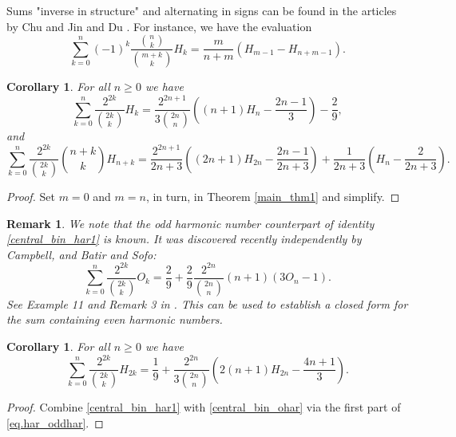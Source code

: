 \documentclass[11pt,reqno]{amsart}
\theoremstyle{plain}
\numberwithin{equation}{section}
\newtheorem{corollary}[thm]{Corollary}
\newtheorem{remark}[thm]{Remark}
\begin{document}
Sums "inverse in structure" and alternating in signs can be found in the articles by Chu \cite{Chu} and Jin and Du \cite{Jin}.
For instance, we have the evaluation
\begin{equation*}
\sum_{k=0}^n (-1)^k \frac{\binom{n}{k}}{\binom{m+k}{k}} H_k = \frac{m}{n+m} \left ( H_{m-1} - H_{n+m-1} \right ).
\end{equation*}

\begin{corollary}
For all $n\geq 0$ we have
\begin{equation}\label{central_bin_har1}
\sum_{k=0}^n \frac{2^{2k}}{\binom{2k}{k}} H_k = \frac{2^{2n+1}}{3\binom{2n}{n}}\left ( (n+1)H_n - \frac{2n-1}{3} \right ) - \frac{2}{9},
\end{equation}
and
\begin{equation}\label{central_bin_har2}
\sum_{k=0}^n \frac{2^{2k}}{\binom{2k}{k}} \binom{n+k}{k} H_{n+k} = \frac{2^{2n+1}}{2n+3}\left ( (2n+1)H_{2n} - \frac{2n-1}{2n+3} \right )
+ \frac{1}{2n+3}\left ( H_{n} - \frac{2}{2n+3} \right ).
\end{equation}
\end{corollary}
\begin{proof}
Set $m=0$ and $m=n$, in turn, in Theorem \ref{main_thm1} and simplify.
\end{proof}

\begin{remark}
We note that the odd harmonic number counterpart of identity \eqref{central_bin_har1} is known. It was discovered recently independently by 
Campbell, and Batir and Sofo:
\begin{equation}\label{central_bin_ohar}
\sum_{k=0}^n \frac{2^{2k}}{\binom{2k}{k}} O_k = \frac{2}{9} + \frac{2}{9}\frac{2^{2n}}{\binom{2n}{n}}(n+1)(3O_n - 1).
\end{equation}
See Example 11 and Remark 3 in \cite{Batir2}. This can be used to establish a closed form for the sum containing even harmonic numbers.
\end{remark}

\begin{corollary}
For all $n\geq 0$ we have
\begin{equation}\label{central_bin_evenhar}
\sum_{k=0}^n \frac{2^{2k}}{\binom{2k}{k}} H_{2k} = \frac{1}{9} + \frac{2^{2n}}{3 \binom{2n}{n}}\left (2(n+1)H_{2n} - \frac{4n+1}{3}\right ).
\end{equation}
\end{corollary}
\begin{proof}
Combine \eqref{central_bin_har1} with \eqref{central_bin_ohar} via the first part of \eqref{eq.har_oddhar}.
\end{proof}
\end{document}
